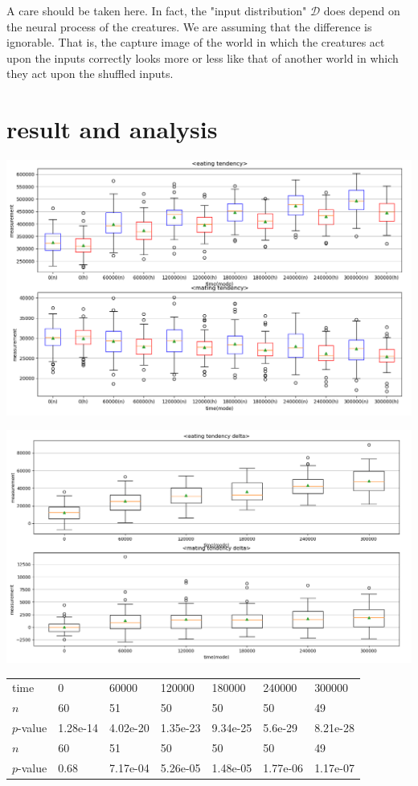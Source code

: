 \documentclass{article}
\numberwithin{equation}{section}
\begin{document}
A care should be taken here. In fact, the "input distribution" $\mathcal{D}$ does depend on the neural process of the creatures. We are assuming that the difference is ignorable. That is, the capture image of the world in which the creatures act upon the inputs correctly looks more or less like that of another world in which they act upon the shuffled inputs. 


\section{result and analysis}
\begin{center}
\includegraphics[scale=0.3]{images/main.png}
\end{center}
\begin{center}
\includegraphics[scale=0.3]{images/main2.png}
\end{center}
\begin{table}[htb]
\begin{tabular}{lllllll}
time & 0 & 60000 & 120000 & 180000&240000&300000 \\
$n$&60&51&50&50&50&49 \\
$p$-value&1.28e-14&4.02e-20&1.35e-23&9.34e-25&5.6e-29&8.21e-28\\
$n$&60&51&50&50&50&49  \\
$p$-value&0.68&7.17e-04&5.26e-05&1.48e-05&1.77e-06&1.17e-07  
  
\end{tabular}
\end{table}
\end{document}
